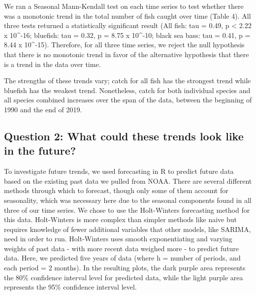 \documentclass[
  12pt,
]{article}
\begin{document}
We ran a Seasonal Mann-Kendall test on each time series to test whether
there was a monotonic trend in the total number of fish caught over time
(Table 4). All three tests returned a statistically significant result
(All fish: tau = 0.49, p \textless{} 2.22 x 10\^{}-16; bluefish: tau =
0.32, p = 8.75 x 10\^{}-10; black sea bass: tau = 0.41, p = 8.44 x
10\^{}-15). Therefore, for all three time series, we reject the null
hypothesis that there is no monotonic trend in favor of the alternative
hypothesis that there is a trend in the data over time.

The strengths of these trends vary; catch for all fish has the strongest
trend while bluefish has the weakest trend. Nonetheless, catch for both
individual species and all species combined increases over the span of
the data, between the beginning of 1990 and the end of 2019.

\hypertarget{question-2-what-could-these-trends-look-like-in-the-future}{%
\subsection{Question 2: What could these trends look like in the
future?}\label{question-2-what-could-these-trends-look-like-in-the-future}}

To investigate future trends, we used forecasting in R to predict future
data based on the existing past data we pulled from NOAA. There are
several different methods through which to forecast, though only some of
them account for seasonality, which was necessary here due to the
seasonal components found in all three of our time series. We chose to
use the Holt-Winters forecasting method for this data. Holt-Winters is
more complex than simpler methods like naive but requires knowledge of
fewer additional variables that other models, like SARIMA, need in order
to run. Holt-Winters uses smooth exponentiating and varying weights of
past data - with more recent data weighed more - to predict future data.
Here, we predicted five years of data (where h = number of periods, and
each period = 2 months). In the resulting plots, the dark purple area
represents the 80\% confidence interval level for predicted data, while
the light purple area represents the 95\% confidence interval level.
\end{document}
